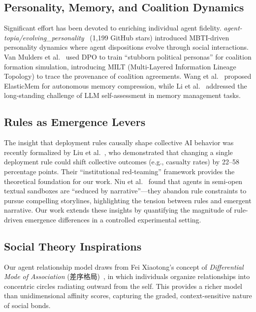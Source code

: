 \documentclass[11pt]{article}
\begin{document}
\subsection{Personality, Memory, and Coalition Dynamics}

Significant effort has been devoted to enriching individual agent fidelity.
\emph{agent-topia/evolving\_personality}~\cite{agenttopia2026personality} (1{,}199 GitHub stars) introduced MBTI-driven personality dynamics where agent dispositions evolve through social interactions.
Van Mulders et al.~\cite{vanmulders2026digital} used DPO to train ``stubborn political personas'' for coalition formation simulation, introducing MILT (Multi-Layered Information Lineage Topology) to trace the provenance of coalition agreements.
Wang et al.~\cite{wang2026elasticmem} proposed ElasticMem for autonomous memory compression, while Li et al.~\cite{li2026supersede} addressed the long-standing challenge of LLM self-assessment in memory management tasks.

\subsection{Rules as Emergence Levers}

The insight that deployment rules causally shape collective AI behavior was recently formalized by Liu et al.~\cite{institutional2026redteaming}, who demonstrated that changing a single deployment rule could shift collective outcomes (e.g., casualty rates) by 22--58 percentage points.
Their ``institutional red-teaming'' framework provides the theoretical foundation for our work.
Niu et al.~\cite{niu2026seduced} found that agents in semi-open textual sandboxes are ``seduced by narrative''---they abandon rule constraints to pursue compelling storylines, highlighting the tension between rules and emergent narrative.
Our work extends these insights by quantifying the magnitude of rule-driven emergence differences in a controlled experimental setting.

\subsection{Social Theory Inspirations}

Our agent relationship model draws from Fei Xiaotong's concept of \emph{Differential Mode of Association} (差序格局)~\cite{fei1947xiangtu}, in which individuals organize relationships into concentric circles radiating outward from the self.
This provides a richer model than unidimensional affinity scores, capturing the graded, context-sensitive nature of social bonds.
\end{document}
